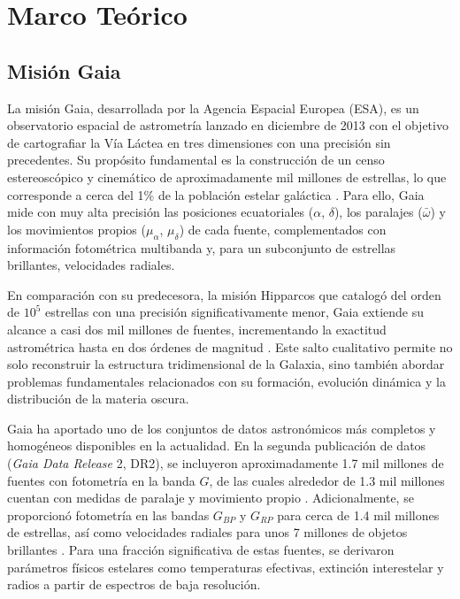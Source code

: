 
\chapter{Marco Teórico}
\label{cap:marco_teorico}

\section{Misión Gaia}
    La misión Gaia, desarrollada por la Agencia Espacial Europea (ESA), es un 
    observatorio espacial de astrometría lanzado en diciembre de 2013 con el 
    objetivo de cartografiar la Vía Láctea en tres dimensiones con una precisión 
    sin precedentes. Su propósito fundamental es la construcción de un censo 
    estereoscópico y cinemático de aproximadamente mil millones de estrellas, 
    lo que corresponde a cerca del 1\% de la población estelar galáctica 
    \cite{Perryman2002}. Para ello, Gaia mide con muy alta precisión las 
    posiciones ecuatoriales ($\alpha$, $\delta$), los paralajes ($\bar{\omega}$) 
    y los movimientos propios ($\mu_\alpha$, $\mu_\delta$) de cada fuente, 
    complementados con información fotométrica multibanda y, para un subconjunto 
    de estrellas brillantes, velocidades radiales.

    En comparación con su predecesora, la misión Hipparcos que catalogó del 
    orden de $10^5$ estrellas con una precisión significativamente menor, Gaia 
    extiende su alcance a casi dos mil millones de fuentes, incrementando la 
    exactitud astrométrica hasta en dos órdenes de magnitud \cite{ESA2013facts}. 
    Este salto cualitativo permite no solo reconstruir la estructura 
    tridimensional de la Galaxia, sino también abordar problemas fundamentales 
    relacionados con su formación, evolución dinámica y la distribución de la 
    materia oscura.

    Gaia ha aportado uno de los conjuntos de datos astronómicos más completos y 
    homogéneos disponibles en la actualidad. En la segunda publicación de datos 
    (\textit{Gaia Data Release} 2, DR2), se incluyeron aproximadamente 1.7 mil 
    millones de fuentes con fotometría en la banda $G$, de las cuales alrededor 
    de 1.3 mil millones cuentan con medidas de paralaje y movimiento propio 
    \cite{Brown2018}. Adicionalmente, se proporcionó fotometría en las bandas 
    $G_{BP}$ y $G_{RP}$ para cerca de 1.4 mil millones de estrellas, así como 
    velocidades radiales para unos 7 millones de objetos brillantes 
    \cite{Brown2018}. Para una fracción significativa de estas fuentes, 
    se derivaron parámetros físicos estelares como temperaturas efectivas, 
    extinción interestelar y radios a partir de espectros de baja resolución.

